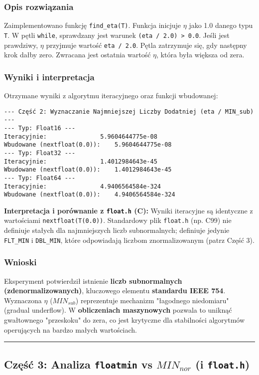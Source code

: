 \documentclass[11pt, a4paper]{article}
\newcommand{\taskseparator}{\leavevmode\leaders\hrule height 0.5pt\hfill\kern0pt}
\begin{document}
\subsubsection{Opis rozwiązania}
Zaimplementowano funkcję \texttt{find\_eta(T)}. Funkcja inicjuje $\eta$ jako 1.0 danego typu \texttt{T}. W pętli \texttt{while}, sprawdzany jest warunek \texttt{(eta / 2.0) > 0.0}. Jeśli jest prawdziwy, $\eta$ przyjmuje wartość \texttt{eta / 2.0}. Pętla zatrzymuje się, gdy następny krok dałby zero. Zwracana jest ostatnia wartość $\eta$, która była większa od zera.

\subsubsection{Wyniki i interpretacja}
Otrzymane wyniki z algorytmu iteracyjnego oraz funkcji wbudowanej:
\begin{verbatim}
--- Część 2: Wyznaczanie Najmniejszej Liczby Dodatniej (eta / MIN_sub) ---
--- Typ: Float16 ---
Iteracyjnie:               5.9604644775e-08
Wbudowane (nextfloat(0.0)):    5.9604644775e-08
--- Typ: Float32 ---
Iteracyjnie:               1.4012984643e-45
Wbudowane (nextfloat(0.0)):    1.4012984643e-45
--- Typ: Float64 ---
Iteracyjnie:               4.9406564584e-324
Wbudowane (nextfloat(0.0)):    4.9406564584e-324
\end{verbatim}

\noindent \textbf{Interpretacja i porównanie z \texttt{float.h} (C):}
Wyniki iteracyjne są identyczne z wartościami \texttt{nextfloat(T(0.0))}. Standardowy plik \texttt{float.h} (np. C99) nie definiuje stałych dla najmniejszych liczb subnormalnych; definiuje jedynie \texttt{FLT\_MIN} i \texttt{DBL\_MIN}, które odpowiadają liczbom znormalizowanym (patrz Część 3).

\subsubsection{Wnioski}
Eksperyment potwierdził istnienie \textbf{liczb subnormalnych (zdenormalizowanych)}, kluczowego elementu \textbf{standardu IEEE 754}. Wyznaczona $\eta$ ($MIN_{sub}$) reprezentuje mechanizm "łagodnego niedomiaru" (gradual underflow). W \textbf{obliczeniach maszynowych} pozwala to uniknąć gwałtownego "przeskoku" do zera, co jest krytyczne dla stabilności algorytmów operujących na bardzo małych wartościach.

\taskseparator

\subsection{Część 3: Analiza \texttt{floatmin} vs \texorpdfstring{$MIN_{nor}$}{MIN\_nor} (i \texttt{float.h})}
\end{document}
